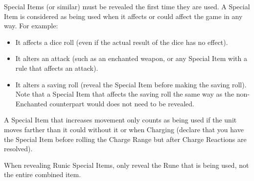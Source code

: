 \begin{optionalrules}
\begin{multicols}{2}
Special Items (or similar) must be revealed the first time they are used. A Special Item is considered as being used when it affects or could affect the game in any way. For example:
\begin{itemize}
\item It affects a dice roll (even if the actual result of the dice has no effect).
\item It alters an attack (such as an enchanted weapon, or any Special Item with a rule that affects an attack).
\item It alters a saving roll (reveal the Special Item before making the saving roll). Note that a Special Item that affects the saving roll the same way as the non-Enchanted counterpart would does not need to be revealed.
\end{itemize}

A Special Item that increases movement only counts as being used if the unit moves farther than it could without it or when Charging (declare that you have the Special Item before rolling the Charge Range but after Charge Reactions are resolved).

When revealing Runic Special Items, only reveal the Rune that is being used, not the entire combined item.
\end{multicols}
\end{optionalrules}\debugfooter%
